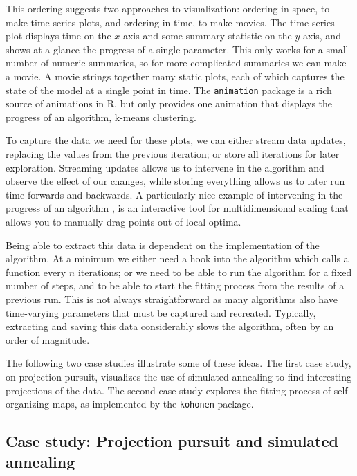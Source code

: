\documentclass[preprint]{imsart}
\begin{document}
This ordering suggests two approaches to visualization: ordering in space, to make time series plots, and ordering in time, to make movies.  The time series plot displays time on the $x$-axis and some summary statistic on the $y$-axis, and shows at a glance the progress of a single parameter.  This only works for a small number of numeric summaries, so for more complicated summaries we can make a movie.  A movie strings together many static plots, each of which captures the state of the model at a single point in time.  The {\tt animation} package \citep{animation} is a rich source of animations in R, but only provides one animation that displays the progress of an algorithm, k-means clustering.

To capture the data we need for these plots, we can either stream data updates, replacing the values from the previous iteration; or store all iterations for later exploration.  Streaming updates allows us to intervene in the algorithm and observe the effect of our changes, while storing everything allows us to later run time forwards and backwards.  A particularly nice example of intervening in the progress of an algorithm \citep{buja:2008}, is an interactive tool for multidimensional scaling that allows you to manually drag points out of local optima.

Being able to extract this data is dependent on the implementation of the algorithm.  At a minimum we either need a hook into the algorithm which calls a function every $n$ iterations; or we need to be able to run the algorithm for a fixed number of steps, and to be able to start the fitting process from the results of a previous run.  This is not always straightforward as many algorithms also have time-varying parameters that must be captured and recreated. Typically, extracting and saving this data  considerably slows the algorithm, often by an order of magnitude.

The following two case studies illustrate some of these ideas.  The first case study, on projection pursuit, visualizes the use of simulated annealing to find interesting projections of the data.  The second case study explores the fitting process of self organizing maps, as implemented by the {\tt kohonen} package.

\subsection{Case study: Projection pursuit and simulated annealing}
\label{sub:guided}
\end{document}
